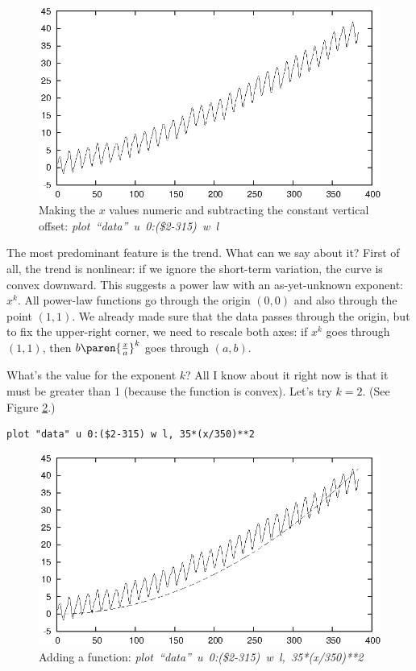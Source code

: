 \begin{figure}[t!]
  \centerline{\includegraphics{img/session02}}
  \caption{Making the $x$ values numeric and subtracting the constant
    vertical offset: \hbox{\em plot ``data'' u 0:(\$2-315) w l}}
  \label{fig:session02}
\end{figure}
    
The most predominant feature is the trend.  What can we say about it?
First of all, the trend is nonlinear: if we ignore the short-term
variation, the curve is convex downward. This suggests a power law
with an as-yet-unknown exponent: $x^k$. All power-law functions go
through the origin $(0,0)$ and also through the point $(1,1)$. We
already made sure that the data passes through the origin, but to fix
the upper-right corner, we need to rescale both axes: if $x^k$ goes
through $(1,1)$, then $b \paren{ \frac{x}{a} }^k$ goes through
$(a,b)$.
    
What's the value for the exponent $k$? All I know about it right now
is that it must be greater than 1 (because the function is convex).
Let's try $k=2$. (See Figure \ref{fig:session03}.)

\begin{verbatim}
plot "data" u 0:($2-315) w l, 35*(x/350)**2
\end{verbatim}

\begin{figure}[t!]
  \centerline{\includegraphics{img/session03}}
  \caption{Adding a function: \hbox{\em plot ``data'' u 0:(\$2-315) w l,
      35*(x/350)**2}}
  \label{fig:session03}
\end{figure}
    

